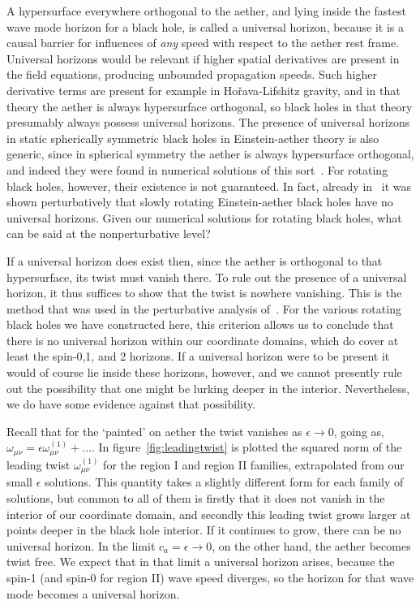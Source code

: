 \documentclass[12pt]{article}
\numberwithin{equation}{section}
\begin{document}
A hypersurface everywhere
orthogonal to the aether,
and lying 
inside the fastest wave mode horizon
for a black hole,
is called a universal horizon, because 
it is a causal barrier for influences of {\it any} speed with respect to the aether rest frame. 
Universal horizons would be relevant if higher spatial derivatives are present in the field equations, producing unbounded propagation speeds. Such higher derivative terms are present  for example in Ho\v{r}ava-Lifshitz gravity, and in that theory the aether is
always hypersurface orthogonal, so black holes
in that theory presumably always possess universal horizons. 
The presence of universal horizons
in static spherically symmetric black holes
in Einstein-aether theory is also
generic, since in spherical symmetry the
aether is always hypersurface orthogonal,
and indeed they were found 
in numerical solutions of this sort~\cite{Barausse:2011pu}. 
For rotating black holes, however, 
their existence is not guaranteed.
In fact, already in~\cite{Barausse:2015frm} it was shown perturbatively that slowly rotating Einstein-aether black holes have no universal horizons. 
Given our numerical solutions for rotating black holes, what can be said at the nonperturbative level?

If a universal horizon does exist then, since the aether is orthogonal to that hypersurface, its twist must vanish there. 
To rule out the presence of a universal horizon, it thus suffices to show that the twist is nowhere vanishing. This is the method that was used in the perturbative analysis of~\cite{Barausse:2015frm}. For the various rotating black holes we have constructed here, this criterion allows
us to conclude that there is no universal horizon within our coordinate domains, which do cover at least the spin-0,1, and 2 horizons.
If a universal horizon were to be present it would of course lie inside these horizons, however, and 
we cannot presently rule out the possibility that one might be lurking deeper in the interior. Nevertheless, we do have some evidence 
against that possibility.

Recall that for the `painted' on aether the twist vanishes as $\epsilon \to 0$, going as, $\omega_{\mu\nu} = \epsilon \omega^{(1)}_{\mu\nu} + \ldots$. In figure~\ref{fig:leadingtwist} 
is plotted the squared norm of the leading twist $\omega^{(1)}_{\mu\nu}$
for the region I and region II families,
extrapolated 
from our small $\epsilon$ solutions. This quantity takes a slightly different form for each family of solutions, but common to all of them
is firstly that it does not vanish in the interior of our coordinate domain, and secondly this leading twist
grows larger at points deeper in the black hole interior. 
If it continues to grow, there can be
no universal horizon. 
In the limit $c_a = \epsilon \to 0$,
on the other hand, the aether becomes twist free. We 
expect that 
in that limit a universal horizon
arises, because the spin-1 
(and spin-0 for region II)
wave speed diverges,
so the horizon for that wave mode 
becomes a universal horizon.
\end{document}
